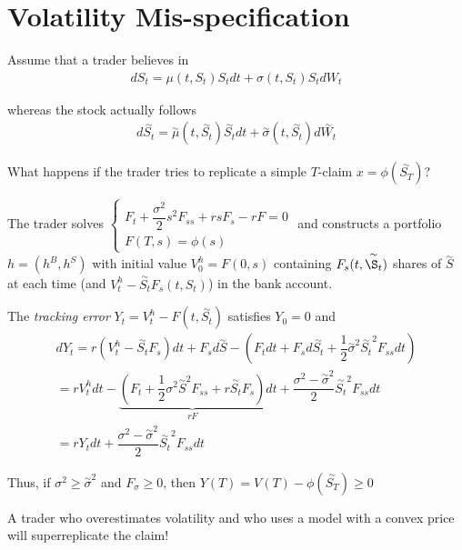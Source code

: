 \section{Volatility Mis-specification}
\noindent Assume that a trader believes in 
\begin{equation*}
  \begin{gathered}
    dS_t = \mu(t,S_t)S_tdt + \sigma(t,S_t)S_t dW_t
  \end{gathered}
\end{equation*}\par
\noindent whereas the stock actually follows
\begin{equation*}
  \begin{gathered}
    d\stackrel{\sim}{S_t} = \stackrel{\sim}{\mu}(t,\stackrel{\sim}{S_t})\stackrel{\sim}{S_t}dt + \stackrel{\sim}{\sigma}(t,\stackrel{\sim}{S_t})d\stackrel{\sim}{W_t}
  \end{gathered}
\end{equation*}\par
\noindent What happens if the trader tries to replicate a simple $T$-claim $x=\phi(\stackrel{\sim}{S_T})$?\par
\noindent The trader solves $\begin{cases}
  F_t+\dfrac{\sigma^2}{2}s^2F_{ss}+rsF_s-rF=0\\
  F(T,s) = \phi(s)
\end{cases}$ and constructs a portfolio $h = (h^B,h^S)$ with initial value $V_0^h = F(0,s)$ containing $F_s(t,\stackrel{\sim}{\S_t})$ shares of $\stackrel{\sim}{S}$ at each time (and $V_t^h - \stackrel{\sim}{S_t}F_s(t,S_t)$) in the bank account.
\par\bigskip
\noindent The \textit{tracking error} $Y_t = V_t^h-F(t,\stackrel{\sim}{S_t})$ satisfies $Y_0=0$ and
\begin{equation*}
  \begin{gathered}
    dY_t = r(V_t^h-\stackrel{\sim}{S_t}F_s)dt + F_sd\stackrel{\sim}{S}-\left(F_tdt+F_sd\stackrel{\sim}{S_t}+\dfrac{1}{2}\stackrel{\sim}{\sigma}^2\stackrel{\sim}{S_t}^2F_{ss}dt\right)\\
    = rV_t^hdt-\underbrace{\left(F_t+\dfrac{1}{2}\sigma^2\stackrel{\sim}{S}^2F_{ss}+r\stackrel{\sim}{S_t}F_s\right)}_{rF}dt + \dfrac{\sigma^2-\stackrel{\sim}{\sigma}^2}{2}\stackrel{\sim}{S_t}^2F_{ss}dt\\
    = rY_tdt+\dfrac{\sigma^2-\stackrel{\sim}{\sigma}^2}{2}\stackrel{\sim}{S_t}^2F_{ss}dt
  \end{gathered}
\end{equation*}\par
\noindent Thus, if $\sigma^2\geq\stackrel{\sim}{\sigma}^2$ and $F_{\sigma}\geq0$, then $Y(T) = V(T)-\phi(\stackrel{\sim}{S_T})\geq0$
\par\bigskip
\noindent A trader who overestimates volatility and who uses a model with a convex price will superreplicate the claim!
\par\bigskip
